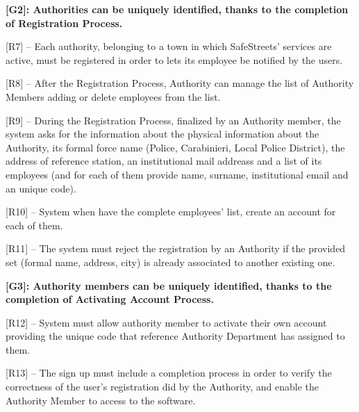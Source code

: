 \documentclass[12pt]{article}
\begin{document}
\vspace{4mm}
\textbf{[G2]: Authorities can be uniquely identified, thanks to the completion of Registration Process.}
\vspace{2mm}
\begin{flushleft}


[R7] -- Each authority, belonging to a town in which SafeStreets’ services are active, must be registered in order to lets its employee be notified by the users.
\vspace{2mm}

[R8] – After the Registration Process, Authority can manage the list of Authority Members adding or delete employees from the list.
\vspace{2mm}

[R9] – During the Registration Process, finalized by an Authority member, the system asks for the information about the physical information about the Authority, its formal force name (Police, Carabinieri, Local Police District), the address of reference station, an institutional mail addreass and a list of its employees (and for each of them provide name, surname, institutional email and an unique code).
\vspace{2mm}

[R10] – System when have the complete employees’ list, create an account for each of them.
\vspace{2mm}

[R11] – The system must reject the registration by an Authority if the provided set (formal name, address, city) is already associated to another existing one.
\vspace{2mm}


\vspace{4mm}
\textbf{[G3]: Authority members can be uniquely identified, thanks to the completion of Activating Account Process.}
\vspace{2mm}

[R12] -- System must allow authority member to activate their own account providing the unique code that reference Authority Department has assigned to them.
\vspace{2mm}

[R13] – The sign up must include a completion process in order to verify the correctness of the user’s registration did by the Authority, and enable the Authority Member to access to the software.
\vspace{2mm}


\end{flushleft}
\end{document}
